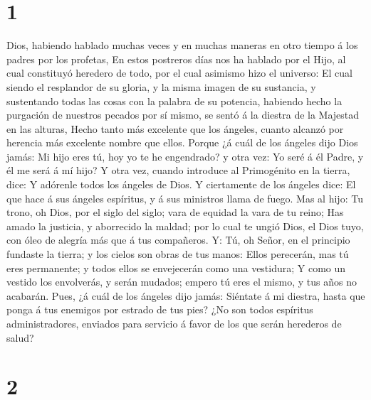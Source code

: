 \hypertarget{section}{%
\section{1}\label{section}}

 Dios, habiendo hablado muchas veces y en muchas maneras en
otro tiempo á los padres por los profetas,  En estos
postreros días nos ha hablado por el Hijo, al cual constituyó heredero
de todo, por el cual asimismo hizo el universo:  El cual
siendo el resplandor de su gloria, y la misma imagen de su sustancia, y
sustentando todas las cosas con la palabra de su potencia, habiendo
hecho la purgación de nuestros pecados por sí mismo, se sentó á la
diestra de la Majestad en las alturas,  Hecho tanto más
excelente que los ángeles, cuanto alcanzó por herencia más excelente
nombre que ellos.  Porque ¿á cuál de los ángeles dijo Dios
jamás: Mi hijo eres tú, hoy yo te he engendrado? y otra vez: Yo seré á
él Padre, y él me será á mí hijo?  Y otra vez, cuando
introduce al Primogénito en la tierra, dice: Y adórenle todos los
ángeles de Dios.  Y ciertamente de los ángeles dice: El que
hace á sus ángeles espíritus, y á sus ministros llama de fuego.
 Mas al hijo: Tu trono, oh Dios, por el siglo del siglo;
vara de equidad la vara de tu reino;  Has amado la justicia,
y aborrecido la maldad; por lo cual te ungió Dios, el Dios tuyo, con
óleo de alegría más que á tus compañeros.  Y: Tú, oh Señor,
en el principio fundaste la tierra; y los cielos son obras de tus manos:
 Ellos perecerán, mas tú eres permanente; y todos ellos se
envejecerán como una vestidura;  Y como un vestido los
envolverás, y serán mudados; empero tú eres el mismo, y tus años no
acabarán.  Pues, ¿á cuál de los ángeles dijo jamás:
Siéntate á mi diestra, hasta que ponga á tus enemigos por estrado de tus
pies?  ¿No son todos espíritus administradores, enviados
para servicio á favor de los que serán herederos de salud?

\hypertarget{section-1}{%
\section{2}\label{section-1}}

